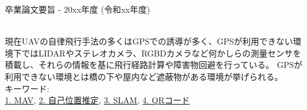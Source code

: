 卒業論文要旨 - 20xx年度 (令和xx年度)
\begin{center}
\begin{large}
\end{large}
\end{center}
~ \\
現在UAVの自律飛行手法の多くはGPSでの誘導が多く、GPSが利用できない環境下ではLIDARやステレオカメラ、RGBDカメラなど何かしらの測量センサを積載し、それらの情報を基に飛行経路計算や障害物回避を行っている。  
GPSが利用できない環境とは橋の下や屋内など遮蔽物がある環境が挙げられる。  
~ \\
キーワード:\\
\underline{1. MAV},
\underline{2. 自己位置推定},
\underline{3. SLAM},
\underline{4. QRコード}
\begin{flushright}
\dept \\
\author
\end{flushright}
